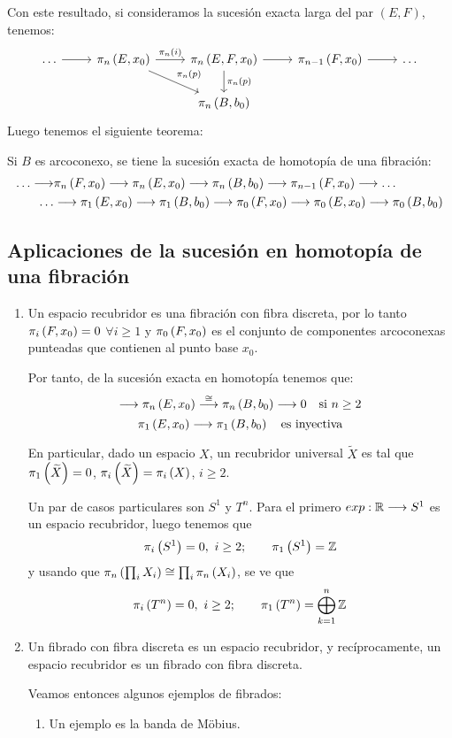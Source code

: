 Con este resultado, si consideramos la sucesión exacta larga del par $(E, F)$, tenemos:
\[
\begin{tikzcd}
\dots \arrow{r} & \homot{n}{E, x_0} \arrow{r}{\homot{n}{i}} \arrow{dr}{\homot{n}{p}} & \homot{n}{E, F, x_0} \arrow{r} \arrow{d}{\homot{n}{p}} & \homot{n-1}{F, x_0} \arrow{r} & \dots \\
 & & \homot{n}{B, b_0} & &
\end{tikzcd}
\]
Luego tenemos el siguiente teorema:
\begin{teor}
Si $B$ es arcoconexo, se tiene la sucesión exacta de homotopía de una fibración:
\begin{align*}
\dots \longrightarrow &\homot{n}{F, x_0} \longrightarrow \homot{n}{E, x_0} \longrightarrow \homot{n}{B, b_0} \longrightarrow \homot{n-1}{F, x_0} \longrightarrow \dots \\
 \dots & \longrightarrow \homot{1}{E, x_0} \longrightarrow \homot{1}{B, b_0} \longrightarrow \homot{0}{F, x_0} \longrightarrow \homot{0}{E, x_0} \longrightarrow \homot{0}{B, b_0}
\end{align*}
\end{teor}

\subsection*{Aplicaciones de la sucesión en homotopía de una fibración}
\begin{enumerate}
\item Un espacio recubridor es una fibración con fibra discreta, por lo tanto $\pi_{i}\left(F, x_0\right) = \nobreak 0$ $\forall i \geq  1$ y $\pi_{0}\left(F, x_0\right)$ es el conjunto de componentes arcoconexas punteadas que contienen al punto base $x_0$.  \par
Por tanto, de la sucesión exacta en homotopía tenemos que:
\[
\longrightarrow \homot{n}{E, x_0} \stackrel{\cong}{\longrightarrow} \homot{n}{B, b_0} \longrightarrow 0 \quad \text{si } n \geq 2
\]
\[
\homot{1}{E, x_0} \longrightarrow \homot{1}{B, b_0} \quad \text{es inyectiva}
\]

En particular, dado un espacio $X$, un recubridor universal $\widetilde{X}$ es tal que  $\pi_{1}\left(\widetilde{X}\right) = 0$, $\pi_{i}\left(\widetilde{X}\right) = \pi_{i}\left(X\right)$, $i \geq 2$. \par
Un par de casos particulares son $S^1$ y $T^n$. Para el primero $exp : \bb{R} \longrightarrow S^1$ es un espacio recubridor, luego tenemos que
\[
\pi_{i}\left(S^1\right) = 0, \ i \geq 2 ; \qquad \pi_{1}\left(S^1\right) = \mathbb{Z}
\]
y usando que $\pi_{n}\left(\prod_i X_i\right) \cong \prod_i \pi_{n}\left(X_i\right)$, se ve que 
\[
\pi_{i}\left(T^n\right) = 0, \ i \geq 2 ; \qquad \pi_{1}\left(T^n\right) = \bigoplus_{k = 1}^{n} \mathbb{Z}
\]

\item Un fibrado con fibra discreta es un espacio recubridor, y recíprocamente, un espacio recubridor es un fibrado con fibra discreta. \par
Veamos entonces algunos ejemplos de fibrados:
\begin{enumerate}
\item Un ejemplo es la banda de Möbius.
\end{enumerate}
\end{enumerate}